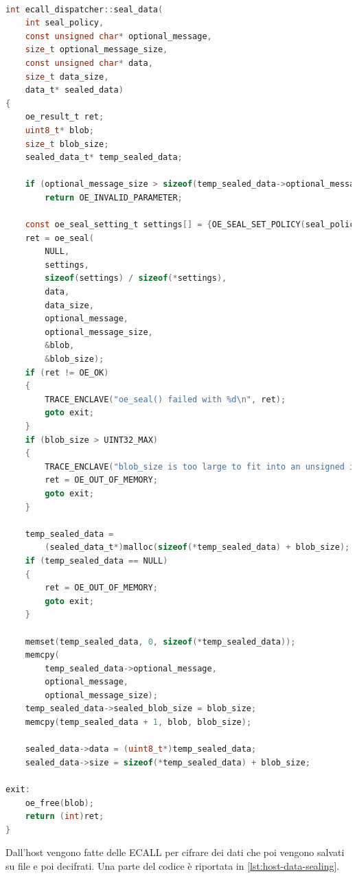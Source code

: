 \documentclass{article}
\begin{document}
\begin{lstlisting}[language=c,caption=Utilizzo di oe\_seal,label=lst:oe-seal-data-example]
 
int ecall_dispatcher::seal_data(
    int seal_policy,
    const unsigned char* optional_message,
    size_t optional_message_size,
    const unsigned char* data,
    size_t data_size,
    data_t* sealed_data)
{
    oe_result_t ret;
    uint8_t* blob;
    size_t blob_size;
    sealed_data_t* temp_sealed_data;

    if (optional_message_size > sizeof(temp_sealed_data->optional_message))
        return OE_INVALID_PARAMETER;

    const oe_seal_setting_t settings[] = {OE_SEAL_SET_POLICY(seal_policy)};
    ret = oe_seal(
        NULL,
        settings,
        sizeof(settings) / sizeof(*settings),
        data,
        data_size,
        optional_message,
        optional_message_size,
        &blob,
        &blob_size);
    if (ret != OE_OK)
    {
        TRACE_ENCLAVE("oe_seal() failed with %d\n", ret);
        goto exit;
    }
    if (blob_size > UINT32_MAX)
    {
        TRACE_ENCLAVE("blob_size is too large to fit into an unsigned int");
        ret = OE_OUT_OF_MEMORY;
        goto exit;
    }

    temp_sealed_data =
        (sealed_data_t*)malloc(sizeof(*temp_sealed_data) + blob_size);
    if (temp_sealed_data == NULL)
    {
        ret = OE_OUT_OF_MEMORY;
        goto exit;
    }

    memset(temp_sealed_data, 0, sizeof(*temp_sealed_data));
    memcpy(
        temp_sealed_data->optional_message,
        optional_message,
        optional_message_size);
    temp_sealed_data->sealed_blob_size = blob_size;
    memcpy(temp_sealed_data + 1, blob, blob_size);

    sealed_data->data = (uint8_t*)temp_sealed_data;
    sealed_data->size = sizeof(*temp_sealed_data) + blob_size;

exit:
    oe_free(blob);
    return (int)ret;
}
\end{lstlisting}

Dall'host vengono fatte delle ECALL per cifrare dei dati che poi vengono salvati su file e poi decifrati. Una parte del codice è riportata in \cref{lst:host-data-sealing}. 
\end{document}
